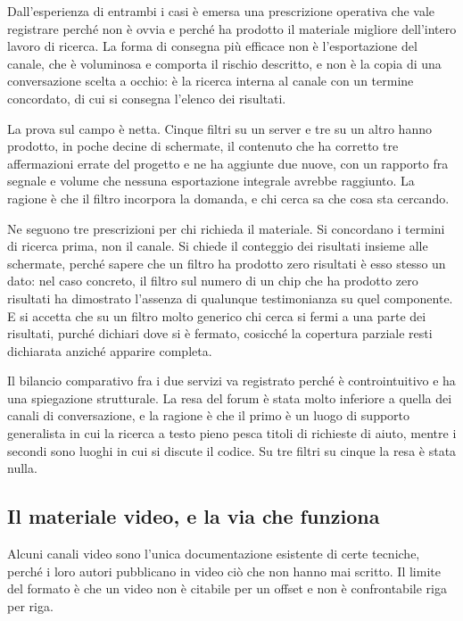 Dall'esperienza di entrambi i casi è emersa una prescrizione operativa che vale registrare perché non è ovvia e perché ha prodotto il materiale migliore dell'intero lavoro di ricerca. La forma di consegna più efficace non è l'esportazione del canale, che è voluminosa e comporta il rischio descritto, e non è la copia di una conversazione scelta a occhio: è la ricerca interna al canale con un termine concordato, di cui si consegna l'elenco dei risultati.

La prova sul campo è netta. Cinque filtri su un server e tre su un altro hanno prodotto, in poche decine di schermate, il contenuto che ha corretto tre affermazioni errate del progetto e ne ha aggiunte due nuove, con un rapporto fra segnale e volume che nessuna esportazione integrale avrebbe raggiunto. La ragione è che il filtro incorpora la domanda, e chi cerca sa che cosa sta cercando.

Ne seguono tre prescrizioni per chi richieda il materiale. Si concordano i termini di ricerca prima, non il canale. Si chiede il conteggio dei risultati insieme alle schermate, perché sapere che un filtro ha prodotto zero risultati è esso stesso un dato: nel caso concreto, il filtro sul numero di un chip che ha prodotto zero risultati ha dimostrato l'assenza di qualunque testimonianza su quel componente. E si accetta che su un filtro molto generico chi cerca si fermi a una parte dei risultati, purché dichiari dove si è fermato, cosicché la copertura parziale resti dichiarata anziché apparire completa.

Il bilancio comparativo fra i due servizi va registrato perché è controintuitivo e ha una spiegazione strutturale. La resa del forum è stata molto inferiore a quella dei canali di conversazione, e la ragione è che il primo è un luogo di supporto generalista in cui la ricerca a testo pieno pesca titoli di richieste di aiuto, mentre i secondi sono luoghi in cui si discute il codice. Su tre filtri su cinque la resa è stata nulla.

\subsection{Il materiale video, e la via che funziona}

Alcuni canali video sono l'unica documentazione esistente di certe tecniche, perché i loro autori pubblicano in video ciò che non hanno mai scritto. Il limite del formato è che un video non è citabile per un offset e non è confrontabile riga per riga.

